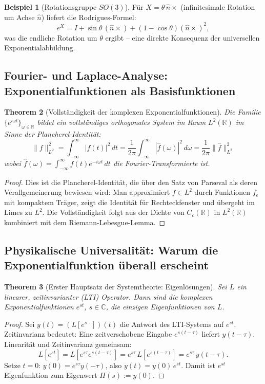 ﻿\documentclass[12pt,a4paper]{article}
\newtheorem{theorem}{Theorem}[section]
\theoremstyle{definition}
\newtheorem{example}[theorem]{Beispiel}
\theoremstyle{remark}
\begin{document}
\begin{example}[Rotationsgruppe $SO(3)$]
Für $X = \theta\,\hat{n}\times$ (infinitesimale Rotation um Achse $\hat{n}$) liefert die Rodrigues-Formel:
\[
e^X = I + \sin\theta\,(\hat{n}\times) + (1-\cos\theta)(\hat{n}\times)^2,
\]
was die endliche Rotation um $\theta$ ergibt -- eine direkte Konsequenz der universellen Exponentialabbildung.
\end{example}

\subsection{Fourier- und Laplace-Analyse: Exponentialfunktionen als Basisfunktionen}

\begin{theorem}[Vollständigkeit der komplexen Exponentialfunktionen]
\label{thm:fourier_vollstaendig}
Die Familie $\{e^{i\omega t}\}_{\omega \in \mathbb{R}}$ bildet ein vollständiges orthogonales System im Raum $L^2(\mathbb{R})$ im Sinne der Plancherel-Identität:
\begin{equation}
\|f\|_{L^2}^2 = \int_{-\infty}^\infty |f(t)|^2\,dt = \frac{1}{2\pi}\int_{-\infty}^\infty |\hat{f}(\omega)|^2\,d\omega = \frac{1}{2\pi}\|\hat{f}\|_{L^2}^2
\end{equation}
wobei $\hat{f}(\omega) = \int_{-\infty}^\infty f(t)e^{-i\omega t}\,dt$ die Fourier-Transformierte ist.
\end{theorem}
\begin{proof}
Dies ist die Plancherel-Identität, die über den Satz von Parseval als deren Verallgemeinerung bewiesen wird: Man approximiert $f \in L^2$ durch Funktionen $f_\epsilon$ mit kompaktem Träger, zeigt die Identität für Rechteckfenster und übergeht im Limes zu $L^2$. Die Vollständigkeit folgt aus der Dichte von $C_c(\mathbb{R})$ in $L^2(\mathbb{R})$ kombiniert mit dem Riemann-Lebesgue-Lemma. 
\end{proof}

\subsection{Physikalische Universalität: Warum die Exponentialfunktion überall erscheint}

\begin{theorem}[Erster Hauptsatz der Systemtheorie: Eigenlösungen]
\label{thm:eigenloesung}
Sei $L$ ein linearer, zeitinvarianter (LTI) Operator. Dann sind die komplexen Exponentialfunktionen $e^{st}$, $s \in \mathbb{C}$, die \emph{einzigen} Eigenfunktionen von $L$.
\end{theorem}
\begin{proof}
Sei $y(t) = (L[e^{s\,\cdot}])(t)$ die Antwort des LTI-Systems auf $e^{st}$. Zeitinvarianz bedeutet: Eine zeitverschobene Eingabe $e^{s(t-\tau)}$ liefert $y(t-\tau)$. Linearität und Zeitinvarianz gemeinsam:
\[
L[e^{st}] = L[e^{s\tau} e^{s(t-\tau)}] = e^{s\tau}\,L[e^{s(t-\tau)}] = e^{s\tau}\,y(t-\tau).
\]
Setze $t=0$: $y(0) = e^{s\tau}y(-\tau)$, also $y(t) = y(0)\,e^{st}$. Damit ist $e^{st}$ Eigenfunktion zum Eigenwert $H(s) := y(0)$. 
\end{proof}
\end{document}
